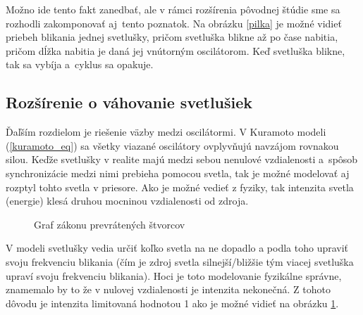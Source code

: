 \documentclass[a4paper, 11pt]{article}
\begin{document}
Možno ide tento fakt zanedbať, ale v rámci rozšírenia pôvodnej štúdie sme sa rozhodli zakomponovať aj~tento poznatok. Na obrázku \ref{pilka} je možné vidieť priebeh blikania jednej svetlušky, pričom svetluška blikne až po čase nabitia, pričom dĺžka nabitia je daná jej vnútorným oscilátorom. Keď svetluška blikne, tak sa vybíja a~cyklus sa opakuje. 

\subsection{Rozšírenie o váhovanie svetlušiek} \label{sec_vahovanie}
Ďaľším rozdielom je riešenie väzby medzi oscilátormi. V Kuramoto modeli (\ref{kuramoto_eq}) sa všetky viazané oscilátory ovplyvňujú navzájom rovnakou silou. Keďže svetlušky v realite majú medzi sebou nenulové vzdialenosti a~spôsob synchronizácie medzi nimi prebieha pomocou svetla, tak je možné modelovať aj rozptyl tohto svetla v priesore. Ako je možné vedieť z fyziky, tak intenzita svetla (energie) klesá druhou mocninou vzdialenosti od zdroja.\cite{InverseLaw} 
\begin{figure}[h]
    \vspace*{-0.9cm}
    \centering
\caption{Graf zákonu prevrátených štvorcov\label{Inverse}}
\end{figure}

\pagebreak
V modeli svetlušky vedia určiť koľko svetla na ne dopadlo a podla toho upraviť svoju frekvenciu blikania (čím je zdroj svetla silnejší/bližšie tým viacej svetluška upraví svoju frekvenciu blikania). Hoci je toto modelovanie fyzikálne správne, znamemalo by to že v nulovej vzdialenosti je intenzita nekonečná. Z tohoto dôvodu je intenzita limitovaná hodnotou 1 ako je možné vidieť na obrázku \ref{Inverse}. 
\end{document}
